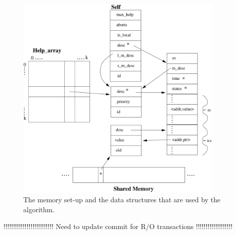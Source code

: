 \documentclass[runningheads,a4paper]{llncs}
\begin{document}
 
 
 
 

\begin{figure}[ht]
\centerline{
    \mbox{\includegraphics[width=0.9\textwidth]{stuff}}
}
\caption{The memory set-up and the data structures that are used by the 
algorithm.}
\label{fig:mem_setup}
\end{figure}
 
!!!!!!!!!!!!!!!!!!!!!!!!!! Need to update commit for R/O transactions !!!!!!!!!!!!!!!!!!!
 
\end{document}
